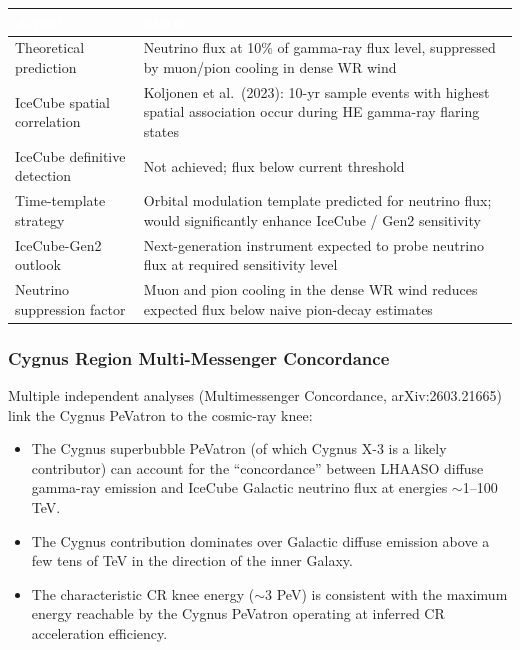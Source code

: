 \documentclass[11pt,letterpaper]{article}
\newcommand{\tableheader}[1]{\textbf{\sffamily\textcolor{white}{#1}}}
\begin{document}
\begin{center}
\begin{tabularx}{\textwidth}{L{4.5cm}X}
\toprule
{}
\tableheader{Aspect} & \tableheader{Status} \\
\midrule
Theoretical prediction & Neutrino flux at 10\% of gamma-ray flux level, suppressed by muon/pion cooling in dense WR wind \\
IceCube spatial correlation & Koljonen et al.\ (2023): 10-yr sample events with highest spatial association occur during HE gamma-ray flaring states \\
IceCube definitive detection & Not achieved; flux below current threshold \\
Time-template strategy & Orbital modulation template predicted for neutrino flux; would significantly enhance IceCube / Gen2 sensitivity \\
IceCube-Gen2 outlook & Next-generation instrument expected to probe neutrino flux at required sensitivity level \\
Neutrino suppression factor & Muon and pion cooling in the dense WR wind reduces expected flux below naive pion-decay estimates \\
\bottomrule
\end{tabularx}
\end{center}

\subsubsection{Cygnus Region Multi-Messenger Concordance}

Multiple independent analyses (Multimessenger Concordance, arXiv:2603.21665) link the Cygnus PeVatron to the cosmic-ray knee:
\begin{itemize}
  \item The Cygnus superbubble PeVatron (of which Cygnus X-3 is a likely contributor) can account for the ``concordance'' between LHAASO diffuse gamma-ray emission and IceCube Galactic neutrino flux at energies $\sim$1--100 TeV.
  \item The Cygnus contribution dominates over Galactic diffuse emission above a few tens of TeV in the direction of the inner Galaxy.
  \item The characteristic CR knee energy ($\sim$3 PeV) is consistent with the maximum energy reachable by the Cygnus PeVatron operating at inferred CR acceleration efficiency.
\end{itemize}
\end{document}
